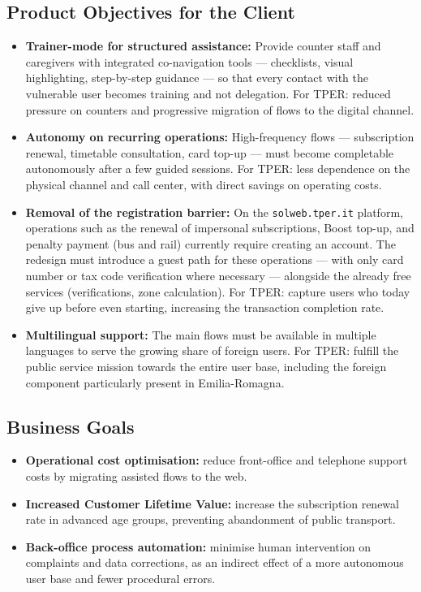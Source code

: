 ﻿\documentclass[11pt,a4paper]{article}
\begin{document}
\subsection{Product Objectives for the Client}
\begin{itemize}[leftmargin=*]

    \item \textbf{Trainer-mode for structured assistance:}
    Provide counter staff and caregivers with integrated co-navigation
    tools --- checklists, visual highlighting, step-by-step guidance ---
    so that every contact with the vulnerable user becomes training and
    not delegation. For TPER: reduced pressure on counters and progressive
    migration of flows to the digital channel.

    \item \textbf{Autonomy on recurring operations:}
    High-frequency flows --- subscription renewal,
    timetable consultation, card top-up --- must become
    completable autonomously
    after a few guided sessions. For TPER: less dependence on the physical
    channel and call center, with direct savings on operating costs.

    \item \textbf{Removal of the registration barrier:}
    On the \texttt{solweb.tper.it} platform, operations such as the renewal
    of impersonal subscriptions, Boost top-up, and penalty payment
    (bus and rail) currently require creating an
    account. The redesign must introduce a guest path for these
    operations --- with only card number or tax code verification where
    necessary --- alongside the already free services
    (verifications, zone calculation). For TPER: capture users who today
    give up before even starting, increasing the transaction
    completion rate.

    \item \textbf{Multilingual support:}
    The main flows must be available in multiple languages to serve
    the growing share of foreign users. For TPER: fulfill the
    public service mission towards the entire user base,
    including the foreign component particularly present in
    Emilia-Romagna.

\end{itemize}

\subsection{Business Goals}
\begin{itemize}[leftmargin=*]
\item \textbf{Operational cost optimisation:} reduce front-office and
telephone support costs by migrating assisted flows to the web.
\item \textbf{Increased Customer Lifetime Value:} increase the subscription
renewal rate in advanced age groups, preventing abandonment of
public transport.
\item \textbf{Back-office process automation:} minimise human
intervention on complaints and data corrections, as an indirect effect
of a more autonomous user base and fewer procedural errors.
\end{itemize}
\end{document}
